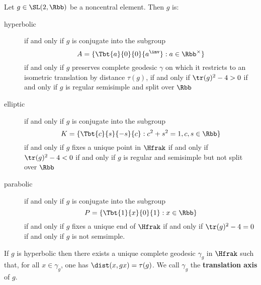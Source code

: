 \begin{proposition}
  Let $g\in \SL(2,\Rbb)$ be a noncentral element. Then $g$ is:
  \begin{description}
    \item[hyperbolic] if and only if $g$ is conjugate into the subgroup
      \[  A = \{\Tbt{a}{0}{0}{a^\inv}: a \in \Rbb^\times \}\]
      if and only if $g$ preserves complete geodesic $\gamma$ on which it restricts to an isometric translation by distance $\tau(g)$, if and only if $\tr(g)^2 -4 >0$ if and only if $g$ is regular semisimple and split over $\Rbb$
    \item[elliptic] if and only if $g$ is conjugate into the subgroup
      \[ K = \{\Tbt{c}{s}{-s}{c}: c^2 + s^2 =1, c,s \in \Rbb\} \]
      if and only if $g$ fixes a unique point in $\Hfrak$ if and only if $\tr(g)^2-4 < 0$ if and only if $g$ is regular and semisimple but not split over $\Rbb$
    \item[parabolic] if and only if $g$ is conjugate into the subgroup
      \[P =\{\Tbt{1}{x}{0}{1}: x \in \Rbb \}\]
      if and only if $g$ fixes a unique end of $\Hfrak$ if and only if $\tr(g)^2 -4 =0$ if and only if $g$ is not semsimple.
  \end{description}
\end{proposition}




If $g$ is hyperbolic then there exists a unique complete geodesic $\gamma_g$ in $\Hfrak$ such that, for all $x \in \gamma_g$, one has $\dist(x,gx) = \tau(g)$. We call $\gamma_g$ the \textbf{translation axis} of $g$.

